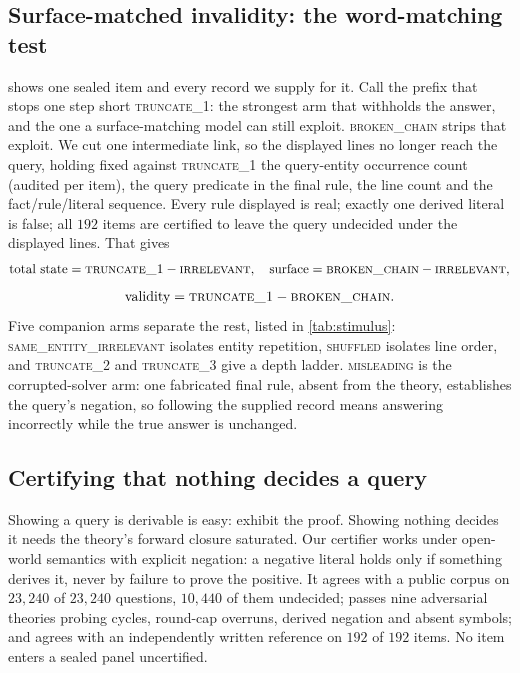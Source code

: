 \documentclass{article}
\begin{document}
\subsection{Surface-matched invalidity: the word-matching test}
\label{sec:broken}
 shows one sealed item and every record we supply for it.
Call the prefix that stops one step short \textsc{truncate\_1}: the strongest
arm that withholds the answer, and the one a surface-matching model can still
exploit. \textsc{broken\_chain} strips that exploit. We cut one
intermediate link, so the displayed lines no longer reach the query, holding
fixed against \textsc{truncate\_1} the query-entity occurrence count (audited
per item), the query predicate in the final rule, the line count and the
fact/rule/literal sequence. Every rule displayed is real; exactly one derived
literal is false; all $192$ items are certified to leave the query undecided
under the displayed lines. That gives
\[
\text{total state} = \textsc{truncate\_1} - \textsc{irrelevant},\quad
\text{surface} = \textsc{broken\_chain} - \textsc{irrelevant},
\]
\[
\text{validity} = \textsc{truncate\_1} - \textsc{broken\_chain}.
\]
Five companion arms separate the rest, listed in \cref{tab:stimulus}:
\textsc{same\_entity\_irrelevant} isolates entity repetition, \textsc{shuffled}
isolates line order, and \textsc{truncate\_2} and \textsc{truncate\_3} give a
depth ladder. \textsc{misleading} is the corrupted-solver arm: one fabricated
final rule, absent from the theory, establishes the query's negation, so
following the supplied record means answering incorrectly while the true answer
is unchanged.

\subsection{Certifying that nothing decides a query}

Showing a query is derivable is easy: exhibit the proof. Showing nothing decides
it needs the theory's forward closure saturated. Our certifier works under
open-world semantics with explicit negation: a negative literal holds only if
something derives it, never by failure to prove the positive. It agrees with a
public corpus \citep{tafjord2020proofwriter} on $23{,}240$ of $23{,}240$
questions, $10{,}440$ of them undecided; passes nine adversarial theories
probing cycles, round-cap overruns, derived negation and absent symbols; and
agrees with an independently written reference on $192$ of $192$ items. No item
enters a sealed panel uncertified.
\end{document}
